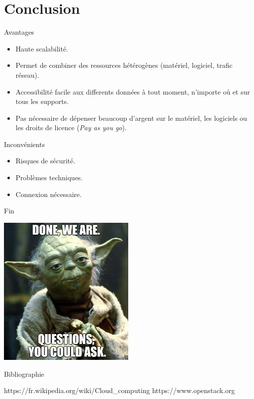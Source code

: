 \documentclass{beamer}
\begin{document}
\section{Conclusion}

\begin{frame}{Avantages}
    \begin{itemize}
        \pause
        \item {
        Haute scalabilité.
        }\pause
        \item {
        Permet de combiner des ressources hétérogènes (matériel, logiciel, trafic réseau).
        }\pause
        \item {
        Accessibilité facile aux differents données à tout moment, n'importe où et sur tous les supports.
        }\pause
        \item {
        Pas nécessaire de dépenser beaucoup d'argent sur le matériel, les logiciels ou les droits de licence  (\textit{Pay as you go}).
        }
    \end{itemize}
\end{frame}

\begin{frame}{Inconvénients}
    \begin{itemize}
        \pause
        \item {
        Risques de sécurité.
        }\pause
        \item {
        Problèmes techniques.
        }\pause
        \item {
        Connexion nécessaire.
        }
    \end{itemize}
\end{frame}

\begin{frame}{Fin}
    \centerline{\includegraphics[width=0.5\textwidth]{images/fin.jpg}}
\end{frame}

\begin{frame}{Bibliographie}
    \begin{thebibliography}{2}
        \bibitem{}
        https://fr.wikipedia.org/wiki/Cloud\_computing
        \bibitem{}
        https://www.openstack.org
    \end{thebibliography}
\end{frame}
\end{document}

